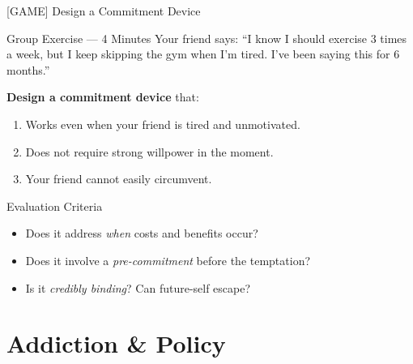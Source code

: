 \documentclass[aspectratio=169]{beamer}
\begin{document}
\begin{frame}{[GAME] Design a Commitment Device}
\begin{alertblock}{Group Exercise --- 4 Minutes}
Your friend says: ``I know I should exercise 3 times a week, but I keep skipping the gym when I'm tired. I've been saying this for 6 months.''
\medskip

\textbf{Design a commitment device} that:
\begin{enumerate}
  \item Works even when your friend is tired and unmotivated.
  \item Does not require strong willpower in the moment.
  \item Your friend cannot easily circumvent.
\end{enumerate}
\end{alertblock}
\begin{block}{Evaluation Criteria}
\begin{itemize}
  \item Does it address \textit{when} costs and benefits occur?
  \item Does it involve a \textit{pre-commitment} before the temptation?
  \item Is it \textit{credibly binding}? Can future-self escape?
\end{itemize}
\end{block}
\end{frame}

\section{Addiction \& Policy}
\end{document}
